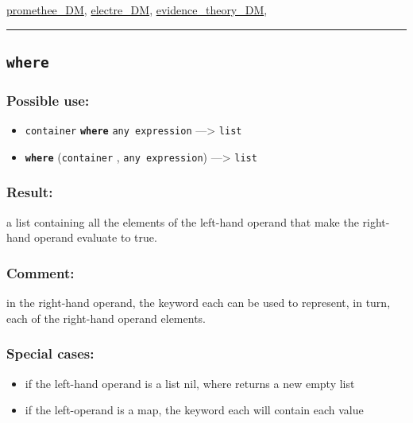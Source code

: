 \documentclass[]{book}
\providecommand{\tightlist}{%
  \setlength{\itemsep}{0pt}\setlength{\parskip}{0pt}}
\theoremstyle{definition}
\theoremstyle{definition}
\theoremstyle{definition}
\theoremstyle{remark}
\begin{document}
\href{OperatorsNR\#promethee_dm}{promethee\_DM},
\href{OperatorsDH\#electre_dm}{electre\_DM},
\href{OperatorsDH\#evidence_theory_dm}{evidence\_theory\_DM},

\begin{center}\rule{0.5\linewidth}{\linethickness}\end{center}

\subsection{\texorpdfstring{\texttt{where}}{where}}\label{where}

\subsubsection{Possible use:}\label{possible-use-555}

\begin{itemize}
\tightlist
\item
  \texttt{container} \textbf{\texttt{where}} \texttt{any\ expression}
  ---\textgreater{} \texttt{list}
\item
  \textbf{\texttt{where}} (\texttt{container} ,
  \texttt{any\ expression}) ---\textgreater{} \texttt{list}
\end{itemize}

\subsubsection{Result:}\label{result-534}

a list containing all the elements of the left-hand operand that make
the right-hand operand evaluate to true.

\subsubsection{Comment:}\label{comment-108}

in the right-hand operand, the keyword each can be used to represent, in
turn, each of the right-hand operand elements.

\subsubsection{Special cases:}\label{special-cases-146}

\begin{itemize}
\tightlist
\item
  if the left-hand operand is a list nil, where returns a new empty
  list\\
\item
  if the left-operand is a map, the keyword each will contain each value
\end{itemize}
\end{document}
